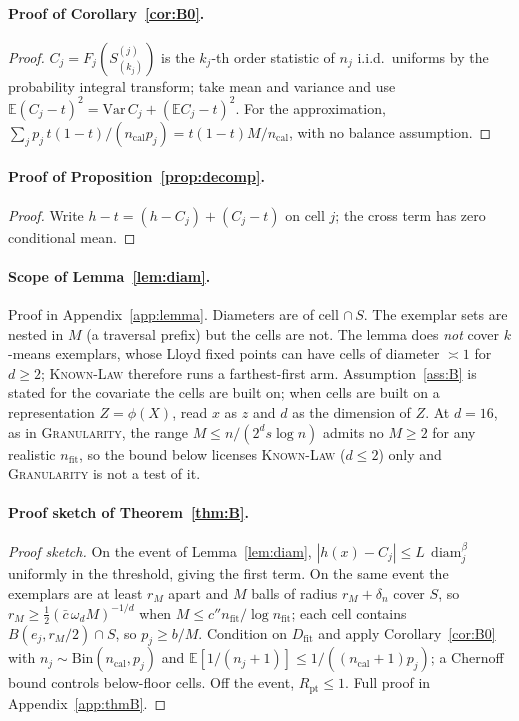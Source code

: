 \documentclass[twoside]{article}
\theoremstyle{definition}
\theoremstyle{remark}
\newcommand{\Dfit}{D_{\mathrm{fit}}}
\newcommand{\E}{\mathbb{E}}
\newcommand{\1}{\mathbf{1}}
\DeclareMathOperator{\diam}{diam}
\newcommand{\expname}[1]{\textsc{#1}}
\begin{document}
\paragraph{Proof of Corollary~\ref{cor:B0}.}
\begin{proof}
$C_j = F_j(S^{(j)}_{(k_j)})$ is the $k_j$-th order statistic of $n_j$ i.i.d.\ uniforms by
the probability integral transform; take mean and variance and use
$\E(C_j-t)^2=\mathrm{Var}\,C_j+(\E C_j-t)^2$. For the approximation,
$\sum_j p_j\,t(1-t)/(n_{\mathrm{cal}}p_j) = t(1-t)M/n_{\mathrm{cal}}$, with no balance
assumption.
\end{proof}

\paragraph{Proof of Proposition~\ref{prop:decomp}.}
\begin{proof}
Write $h-t=(h-C_j)+(C_j-t)$ on cell $j$; the cross term has zero conditional mean.
\end{proof}

\paragraph{Scope of Lemma~\ref{lem:diam}.}
Proof in Appendix~\ref{app:lemma}. Diameters are of cell $\cap\,S$. The exemplar sets are nested in
$M$ (a traversal prefix) but the cells are not. The lemma does \emph{not} cover $k$-means exemplars,
whose Lloyd fixed points can have cells of diameter $\asymp1$ for $d\ge2$; \expname{Known-Law} therefore runs a
farthest-first arm. Assumption~\ref{ass:B} is stated for the covariate the cells are built on; when
cells are built on a representation $Z=\phi(X)$, read $x$ as $z$ and $d$ as the dimension of $Z$. At
$d=16$, as in \expname{Granularity}, the range $M\le n/(2^ds\log n)$ admits no $M\ge2$ for any realistic $n_{\mathrm{fit}}$, so
the bound below licenses \expname{Known-Law} ($d\le2$) only and \expname{Granularity} is not a test of it.

\paragraph{Proof sketch of Theorem~\ref{thm:B}.}
\begin{proof}[Proof sketch]
On the event of Lemma~\ref{lem:diam}, $|h(x)-C_j|\le L\,\diam_j^\beta$ uniformly in the threshold,
giving the first term. On the same event the exemplars are at least $r_M$ apart and $M$ balls of
radius $r_M+\delta_n$ cover $S$, so $r_M\ge\tfrac12(\bar c\,\omega_d M)^{-1/d}$ when $M\le c''n_{\mathrm{fit}}/\log n_{\mathrm{fit}}$;
each cell contains $B(e_j,r_M/2)\cap S$, so $p_j\ge b/M$. Condition on $\Dfit$ and apply Corollary~\ref{cor:B0} with
$n_j\sim\mathrm{Bin}(n_{\mathrm{cal}},p_j)$ and $\E[1/(n_j+1)]\le1/((n_{\mathrm{cal}}+1)p_j)$; a Chernoff
bound controls below-floor cells. Off the event, $R_{\mathrm{pt}}\le1$. Full proof in
Appendix~\ref{app:thmB}.
\end{proof}
\end{document}
